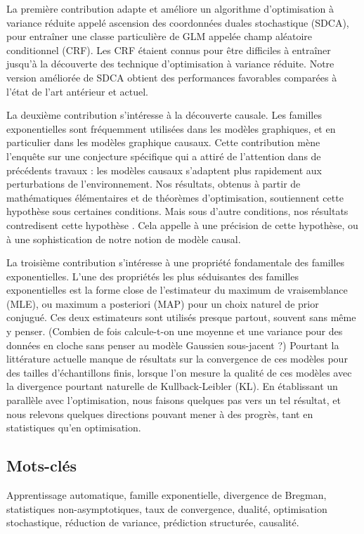 \documentclass[12pt]{report} %
\numberwithin{equation}{chapter}
\numberwithin{table}{chapter}
\numberwithin{figure}{chapter}
\begin{document}
La première contribution adapte et améliore un algorithme d'optimisation à variance réduite appelé ascension des coordonnées duales stochastique (SDCA), pour entraîner une classe particulière de GLM appelée champ aléatoire conditionnel (CRF). Les CRF étaient connus pour être difficiles à entraîner jusqu'à la découverte des technique d'optimisation à variance réduite. Notre version améliorée de SDCA  obtient des performances favorables comparées à l'état de l'art antérieur et actuel. 

La deuxième contribution s'intéresse à la découverte causale. Les familles exponentielles sont fréquemment utilisées dans les modèles graphiques, et en particulier dans les modèles graphique causaux. Cette contribution mène l'enquête sur une conjecture spécifique qui a attiré de l'attention dans de précédents travaux : les modèles causaux s'adaptent plus rapidement aux perturbations de l'environnement. Nos résultats, obtenus à partir de mathématiques élémentaires et de théorèmes d'optimisation, soutiennent cette hypothèse sous certaines conditions. Mais sous d'autre conditions, nos résultats contredisent cette hypothèse . Cela appelle à une précision de cette hypothèse, ou à une sophistication de notre notion de modèle causal.

La troisième contribution s'intéresse à une propriété fondamentale des familles exponentielles. 
L'une des propriétés les plus séduisantes des familles exponentielles est la forme close de l'estimateur du maximum de vraisemblance (MLE), ou maximum a posteriori (MAP) pour un choix naturel de prior conjugué. 
Ces deux estimateurs sont utilisés presque partout, souvent sans même y penser. 
(Combien de fois calcule-t-on une moyenne et une variance pour des données en cloche sans penser au modèle Gaussien sous-jacent ?)
Pourtant la littérature actuelle manque de résultats sur la convergence de ces modèles pour des tailles d'échantillons finis, lorsque l'on mesure la qualité de ces modèles avec la divergence pourtant naturelle de Kullback-Leibler (KL).
En établissant un parallèle avec l'optimisation, nous faisons quelques pas vers un tel résultat, et nous relevons quelques directions pouvant mener à des progrès, tant en statistiques qu'en optimisation.


\subsection*{Mots-clés}
Apprentissage automatique, famille exponentielle, divergence de Bregman, statistiques non-asymptotiques, taux de convergence, dualité, optimisation stochastique, réduction de variance, prédiction structurée, causalité.
\end{document}
